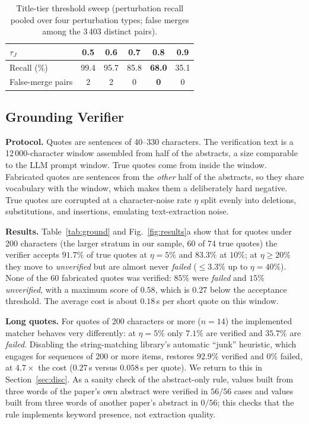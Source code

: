 \documentclass[conference]{IEEEtran}
\begin{document}
\begin{table}[!t]
\caption{Title-tier threshold sweep (perturbation recall pooled over four perturbation types; false merges among the 3\,403 distinct pairs).}
\label{tab:dedup}
\centering
\small
\begin{tabular}{@{}lccccc@{}}
\toprule
$\tau_J$ & 0.5 & 0.6 & 0.7 & \textbf{0.8} & 0.9 \\
\midrule
Recall (\%) & 99.4 & 95.7 & 85.8 & \textbf{68.0} & 35.1 \\
False-merge pairs & 2 & 2 & 0 & \textbf{0} & 0 \\
\bottomrule
\end{tabular}
\end{table}

\subsection{Grounding Verifier}
\textbf{Protocol.} Quotes are sentences of 40--330 characters. The verification text is a 12\,000-character window assembled from half of the abstracts, a size comparable to the LLM prompt window. True quotes come from inside the window. Fabricated quotes are sentences from the \emph{other} half of the abstracts, so they share vocabulary with the window, which makes them a deliberately hard negative. True quotes are corrupted at a character-noise rate $\eta$ split evenly into deletions, substitutions, and insertions, emulating text-extraction noise.

\textbf{Results.} Table~\ref{tab:ground} and Fig.~\ref{fig:results}a show that for quotes under 200 characters (the larger stratum in our sample, 60 of 74 true quotes) the verifier accepts $91.7\%$ of true quotes at $\eta=5\%$ and $83.3\%$ at $10\%$; at $\eta\ge20\%$ they move to \textit{unverified} but are almost never \textit{failed} ($\le3.3\%$ up to $\eta=40\%$). None of the 60 fabricated quotes was verified: $85\%$ were \textit{failed} and $15\%$ \textit{unverified}, with a maximum score of $0.58$, which is $0.27$ below the acceptance threshold. The average cost is about $0.18$\,s per short quote on this window.

\textbf{Long quotes.} For quotes of 200 characters or more ($n{=}14$) the implemented matcher behaves very differently: at $\eta=5\%$ only $7.1\%$ are verified and $35.7\%$ are \textit{failed}. Disabling the string-matching library's automatic ``junk'' heuristic, which engages for sequences of 200 or more items, restores $92.9\%$ verified and $0\%$ failed, at $4.7\times$ the cost ($0.27$\,s versus $0.058$\,s per quote). We return to this in Section~\ref{sec:disc}. As a sanity check of the abstract-only rule, values built from three words of the paper's own abstract were verified in $56/56$ cases and values built from three words of another paper's abstract in $0/56$; this checks that the rule implements keyword presence, not extraction quality.
\end{document}
